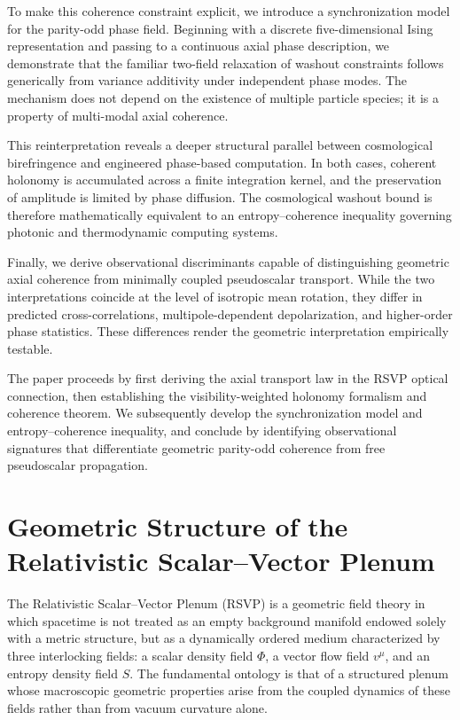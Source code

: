 \documentclass[12pt]{article}
\begin{document}
To make this coherence constraint explicit, we introduce a synchronization model for the parity-odd phase field. Beginning with a discrete five-dimensional Ising representation and passing to a continuous axial phase description, we demonstrate that the familiar two-field relaxation of washout constraints follows generically from variance additivity under independent phase modes. The mechanism does not depend on the existence of multiple particle species; it is a property of multi-modal axial coherence.

This reinterpretation reveals a deeper structural parallel between cosmological birefringence and engineered phase-based computation. In both cases, coherent holonomy is accumulated across a finite integration kernel, and the preservation of amplitude is limited by phase diffusion. The cosmological washout bound is therefore mathematically equivalent to an entropy--coherence inequality governing photonic and thermodynamic computing systems.

Finally, we derive observational discriminants capable of distinguishing geometric axial coherence from minimally coupled pseudoscalar transport. While the two interpretations coincide at the level of isotropic mean rotation, they differ in predicted cross-correlations, multipole-dependent depolarization, and higher-order phase statistics. These differences render the geometric interpretation empirically testable.

The paper proceeds by first deriving the axial transport law in the RSVP optical connection, then establishing the visibility-weighted holonomy formalism and coherence theorem. We subsequently develop the synchronization model and entropy--coherence inequality, and conclude by identifying observational signatures that differentiate geometric parity-odd coherence from free pseudoscalar propagation.

\newpage
\section{Geometric Structure of the Relativistic Scalar--Vector Plenum}

The Relativistic Scalar--Vector Plenum (RSVP) is a geometric field theory in which spacetime is not treated as an empty background manifold endowed solely with a metric structure, but as a dynamically ordered medium characterized by three interlocking fields: a scalar density field $\Phi$, a vector flow field $v^\mu$, and an entropy density field $S$. The fundamental ontology is that of a structured plenum whose macroscopic geometric properties arise from the coupled dynamics of these fields rather than from vacuum curvature alone.
\end{document}
